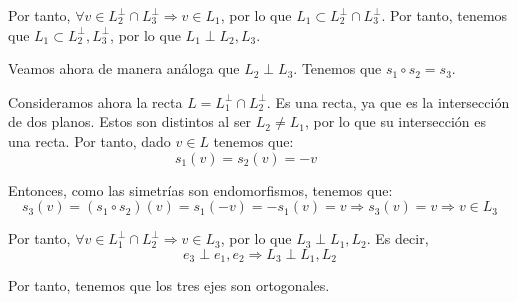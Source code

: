 \begin{ejercicio}
\begin{description}
        Por tanto, $\forall v\in L_2^\perp \cap L_3^\perp \Longrightarrow v\in L_1$, por lo que $L_1\subset L_2^\perp \cap L_3^\perp$. Por tanto, tenemos que $L_1\subset L_2^\perp, L_3^\perp$, por lo que $L_1\perp L_2,L_3$.

        \vspace{0.5cm}Veamos ahora de manera análoga que $L_2\perp L_3$. Tenemos que $s_1\circ s_2 = s_3$.

        Consideramos ahora la recta $L=L_1^\perp \cap L_2^\perp$. Es una recta, ya que es la intersección de dos planos. Estos son distintos al ser $L_2\neq L_1$, por lo que su intersección es una recta. Por tanto, dado $v\in L$ tenemos que:
        \begin{equation*}
            s_1(v)=s_2(v)=-v \qquad 
        \end{equation*}

        Entonces, como las simetrías son endomorfismos, tenemos que:
        \begin{equation*}
            s_3(v) = (s_1\circ s_2)(v) = s_1(-v) = -s_1(v) = v \Longrightarrow s_3(v)=v \Longrightarrow v\in L_3
        \end{equation*}

        Por tanto, $\forall v\in L_1^\perp \cap L_2^\perp \Longrightarrow v\in L_3$, por lo que $L_3\perp L_1,L_2$. Es decir,$$e_3\perp e_1, e_2\Longrightarrow L_3 \perp L_1, L_2$$

        Por tanto, tenemos que los tres ejes son ortogonales.
    \end{description}
        
\end{ejercicio}

